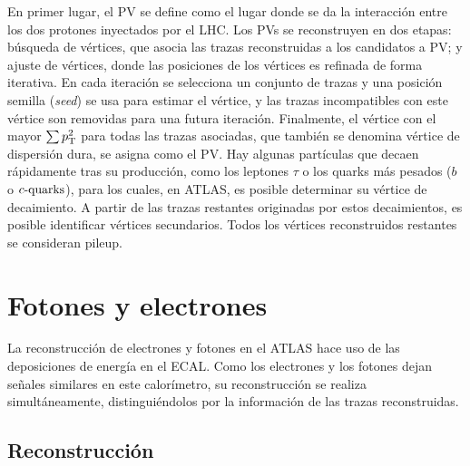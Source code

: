 En primer lugar, el \ac{PV} se define como el lugar donde se da la interacci\'on entre los dos protones inyectados por el \ac{LHC}. Los \acp{PV} se reconstruyen en dos etapas: b\'usqueda de v\'ertices, que asocia las trazas reconstruidas a los candidatos a \ac{PV}; y ajuste de v\'ertices, donde las posiciones de los v\'ertices es refinada de forma iterativa. En cada iteraci\'on se selecciona un conjunto de trazas y una posici\'on semilla (\textit{seed}) se usa para estimar el v\'ertice, y las trazas incompatibles con este v\'ertice son removidas para una futura iteraci\'on.
Finalmente, el vértice con el mayor \(\sum p_{\text{T}}^2\) para todas las trazas asociadas, que tambi\'en se denomina vértice de dispersión dura, se asigna como el \ac{PV}.
Hay algunas partículas que decaen rápidamente tras su producción, como los leptones \(\tau\) o los quarks más pesados (\(b\) o \(c\text{-quarks}\)), para los cuales, en \ac{ATLAS}, es posible determinar su v\'ertice de decaimiento. A partir de las trazas restantes originadas por estos decaimientos, es posible identificar vértices secundarios. Todos los vértices reconstruidos restantes se consideran pileup.








\section{Fotones y electrones}

La reconstrucción de electrones y fotones en el \ac{ATLAS} hace uso de las deposiciones de energía en el \ac{ECAL}. Como los electrones y los fotones dejan señales similares en este calor\'imetro, su reconstrucción se realiza simultáneamente, distinguiéndolos por la información de las trazas reconstruidas.


\subsection{Reconstrucci\'on}
\label{subsec:objects:egamma:reco}

